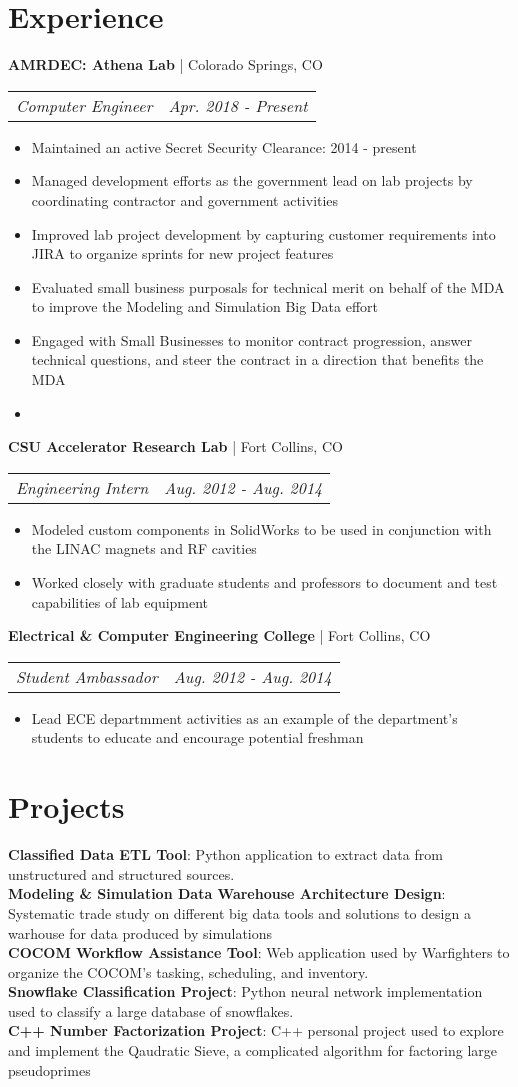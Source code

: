 \documentclass[letterpaper,11pt]{article}
\makeatletter
\newcommand{\resumeItem}[1]{
  \item\small{#1}
}
\newcommand{\resumeItemListStart}{\begin{itemize}[itemsep=1mm, parsep=0mm, topsep=0mm]}
\newcommand{\resumeItemListEnd}{\end{itemize}}
\newcommand{\sectionHeader}[2]{
	\vspace{5pt}\small{ \textbf{#1} | #2}
}
\newcommand{\projectItem}[2]{
  \vspace{5pt}\small{\textbf{#1}{: #2}} \\
}
\newcommand{\sectionSubHeader}[2]{
	\begin{tabular*}{\textwidth}{l@{\extracolsep{\fill}}r}
		\quad\textit{\small{#1}} & \textit{\small{#2}}
	\end{tabular*}
}
\makeatother
\begin{document}
\section{Experience}
    \sectionHeader{AMRDEC: Athena Lab}{Colorado Springs, CO}
   		\sectionSubHeader{Computer Engineer}{Apr. 2018 - Present}
			\resumeItemListStart
				\resumeItem{Maintained an active Secret Security Clearance: 2014 - present}
		   		\resumeItem{Managed development efforts as the government lead on lab projects by coordinating contractor and government activities }
		   		\resumeItem{Improved lab project development by capturing customer requirements into JIRA to organize sprints for new project features}
		   		\resumeItem{Evaluated small business purposals for technical merit on behalf of the MDA to improve the Modeling and Simulation Big Data effort}
		   		\resumeItem{Engaged with Small Businesses to monitor contract progression, answer technical questions, and steer the contract in a direction that benefits the MDA}
		   		\resumeItem{}
		   \resumeItemListEnd
   	\sectionHeader{CSU Accelerator Research Lab}{Fort Collins, CO}
   		\sectionSubHeader{Engineering Intern}{Aug. 2012 - Aug. 2014}
   			\resumeItemListStart
   				\resumeItem{Modeled custom components in SolidWorks to be used in conjunction with the LINAC magnets and RF cavities}
   				\resumeItem{Worked closely with graduate students and professors to document and test capabilities of lab equipment}
   			\resumeItemListEnd
   	\sectionHeader{Electrical \& Computer Engineering College}{Fort Collins, CO}
   		\sectionSubHeader{Student Ambassador}{Aug. 2012 - Aug. 2014}
   			\resumeItemListStart
   				\resumeItem{Lead ECE departmment activities as an example of the department’s students to educate and encourage potential freshman}
   			\resumeItemListEnd
\section{Projects}
	\projectItem{Classified Data ETL Tool}{Python application to extract data from unstructured and structured sources. }
	\projectItem{Modeling \& Simulation Data Warehouse Architecture Design}{Systematic trade study on different big data tools and solutions to design a warhouse for data produced by simulations}
	\projectItem{COCOM Workflow Assistance Tool}{Web application used by Warfighters to organize the COCOM's tasking, scheduling, and inventory. }
	\projectItem{Snowflake Classification Project}{Python neural network implementation used to classify a large database of snowflakes. }
	\projectItem{C++ Number Factorization Project}{C++ personal project used to explore and implement the Qaudratic Sieve, a complicated algorithm for factoring large pseudoprimes}
\end{document}
